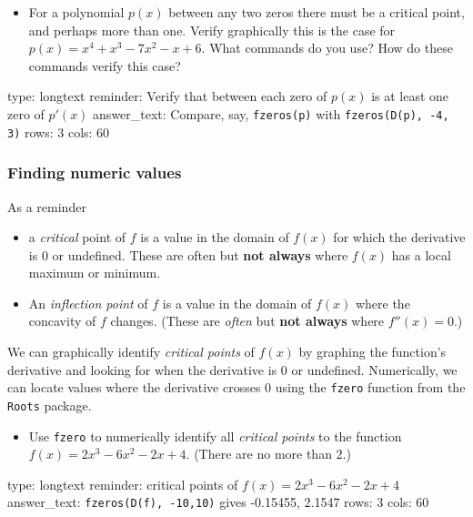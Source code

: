 \documentclass[12pt]{article}
\begin{document}
\begin{itemize}
\itemsep1pt\parskip0pt
\item
  For a polynomial $p(x)$ between any two zeros there must be a critical
  point, and perhaps more than one. Verify graphically this is the case
  for $p(x) =x^4 + x^3 - 7x^2 - x + 6$. What commands do you use? How do
  these commands verify this case?
\end{itemize}

\begin{answer}
type: longtext
reminder: Verify that between each zero of \( p(x) \) is at least one zero of \( p'(x) \)
answer_text: Compare, say, \verb+fzeros(p)+ with \verb+fzeros(D(p), -4, 3)+ 
rows: 3
cols: 60
\end{answer}

\subsubsection{Finding numeric values}

As a reminder

\begin{itemize}
\item
  a \emph{critical} point of $f$ is a value in the domain of $f(x)$ for
  which the derivative is $0$ or undefined. These are often but
  \textbf{not always} where $f(x)$ has a local maximum or minimum.
\item
  An \emph{inflection point} of $f$ is a value in the domain of $f(x)$
  where the concavity of $f$ changes. (These are \emph{often} but
  \textbf{not always} where $f''(x)=0$.)
\end{itemize}

We can graphically identify \emph{critical points} of $f(x)$ by graphing
the function's derivative and looking for when the derivative is 0 or
undefined. Numerically, we can locate values where the derivative
crosses $0$ using the \texttt{fzero} function from the \texttt{Roots}
package.

\begin{itemize}
\itemsep1pt\parskip0pt
\item
  Use \texttt{fzero} to numerically identify all \emph{critical points}
  to the function $f(x) = 2x^3 - 6x^2 - 2x + 4$. (There are no more than
  $2$.)
\end{itemize}

\begin{answer}
type: longtext
reminder: critical points of \( f(x) = 2x^3 - 6x^2 - 2x + 4 \)
answer_text: \verb+fzeros(D(f), -10,10)+ gives -0.15455, 2.1547 
rows: 3
cols: 60
\end{answer}
\end{document}

